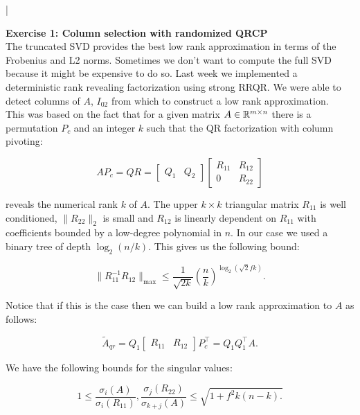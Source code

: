 \documentclass[11pt]{article}
\begin{document}
\lstset{frameround=fttt,language=Matlab}

\lstMakeShortInline[columns=fixed]|



{\bf{Exercise 1: Column selection with randomized QRCP}} \\

The truncated SVD provides the best low rank approximation in terms of the Frobenius and L2 norms. Sometimes we don't want to compute the full SVD because it might be expensive to do so. Last week we implemented a deterministic rank revealing factorization using strong RRQR. We were able to detect columns of $A$, $I_{02}$ from which to construct a low rank approximation. \\

This was based on the fact that for a given matrix $A \in \mathbb{R}^{m \times n}$ there is a permutation $P_c$ and an integer $k$ such that the QR factorization with column pivoting:

\[ AP_{c} = QR = \begin{bmatrix} Q_1 & Q_2 \end{bmatrix} \begin{bmatrix} R_{11} & R_{12} \\ 0 & R_{22} \end{bmatrix} \]

reveals the numerical rank $k$ of $A$. The upper $k \times k$ triangular matrix $R_{11}$ is well conditioned, $\|R_{22}\|_2$ is small and $R_{12}$ is linearly dependent on $R_{11}$ with coefficients bounded by a low-degree polynomial in $n$. In our case we used a binary tree of depth $\log_2\left(n/k\right).$ This gives us the following bound:

\[ \|R_{11}^{-1}R_{12}\|_{\max} \leq \frac{1}{\sqrt{2k}} \left(\frac{n}{k}\right)^{\log_2\left(\sqrt{2}fk\right)} . \]

Notice that if this is the case then we can build a low rank approximation to $A$ as follows:

\[ \tilde{A}_{qr} = Q_{1} \begin{bmatrix} R_{11} & R_{12} \end{bmatrix} P_{c}^{\top} = Q_{1}Q_{1}^\top A. \]

We have the following bounds for the singular values:

\[ 1 \leq \frac{\sigma_{i}(A)}{\sigma_{i}(R_11) }, \frac{\sigma_j(R_{22})}{\sigma_{k+j}(A)} \leq \sqrt{ 1 + f^2k(n-k). } \]
\end{document}
